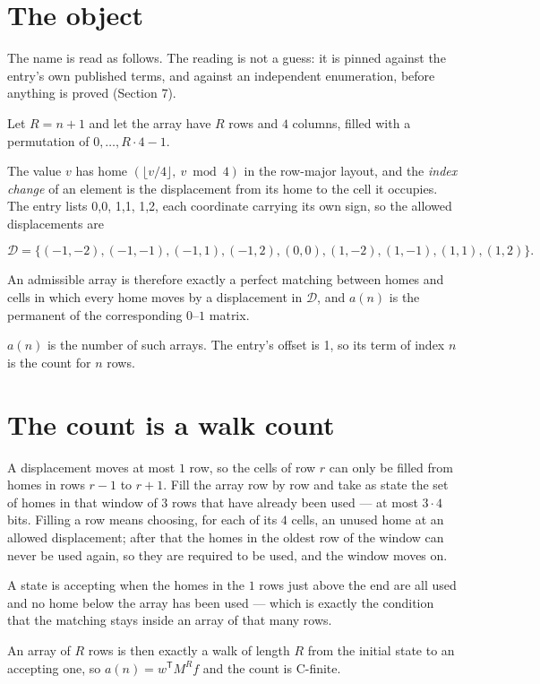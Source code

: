 \documentclass[11pt]{article}
\theoremstyle{definition}
\begin{document}
\section{The object}

The name is read as follows. The reading is not a guess: it is pinned against the entry's own published terms, and against an independent enumeration, before anything is proved (Section 7).

Let $R = n + 1$ and let the array have $R$ rows and $4$ columns, filled with a permutation of $0,\dots,R\cdot4-1$.

The value $v$ has home $(\lfloor v/4\rfloor,\ v \bmod 4)$ in the row-major layout, and the {\itshape index change} of an element is the displacement from its home to the cell it occupies. The entry lists 0,0, 1,1, 1,2, each coordinate carrying its own sign, so the allowed displacements are

\[\mathcal{D} = \{(-1,-2), (-1,-1), (-1,1), (-1,2), (0,0), (1,-2), (1,-1), (1,1), (1,2)\}.\]

An admissible array is therefore exactly a perfect matching between homes and cells in which every home moves by a displacement in $\mathcal{D}$, and $a(n)$ is the permanent of the corresponding $0$--$1$ matrix.

$a(n)$ is the number of such arrays. The entry's offset is 1, so its term of index $n$ is the count for $n$ rows.

\section{The count is a walk count}

A displacement moves at most $1$ row, so the cells of row $r$ can only be filled from homes in rows $r-1$ to $r+1$. Fill the array row by row and take as state the set of homes in that window of $3$ rows that have already been used --- at most $3\cdot4$ bits. Filling a row means choosing, for each of its $4$ cells, an unused home at an allowed displacement; after that the homes in the oldest row of the window can never be used again, so they are required to be used, and the window moves on.

A state is accepting when the homes in the $1$ rows just above the end are all used and no home below the array has been used --- which is exactly the condition that the matching stays inside an array of that many rows.

An array of $R$ rows is then exactly a walk of length $R$ from the initial state to an accepting one, so $a(n) = w^{\mathsf T}M^{R}f$ and the count is C-finite.
\end{document}
